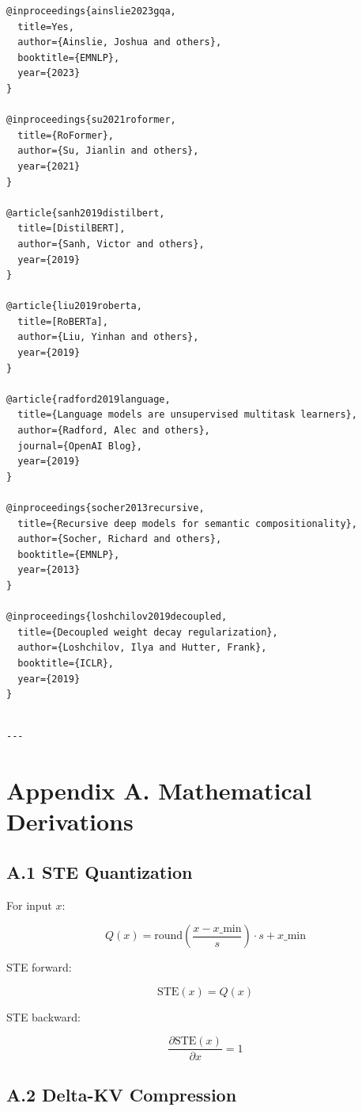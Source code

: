 \begin{lstlisting}
@inproceedings{ainslie2023gqa,
  title=Yes,
  author={Ainslie, Joshua and others},
  booktitle={EMNLP},
  year={2023}
}

@inproceedings{su2021roformer,
  title={RoFormer},
  author={Su, Jianlin and others},
  year={2021}
}

@article{sanh2019distilbert,
  title=[DistilBERT],
  author={Sanh, Victor and others},
  year={2019}
}

@article{liu2019roberta,
  title=[RoBERTa],
  author={Liu, Yinhan and others},
  year={2019}
}

@article{radford2019language,
  title={Language models are unsupervised multitask learners},
  author={Radford, Alec and others},
  journal={OpenAI Blog},
  year={2019}
}

@inproceedings{socher2013recursive,
  title={Recursive deep models for semantic compositionality},
  author={Socher, Richard and others},
  booktitle={EMNLP},
  year={2013}
}

@inproceedings{loshchilov2019decoupled,
  title={Decoupled weight decay regularization},
  author={Loshchilov, Ilya and Hutter, Frank},
  booktitle={ICLR},
  year={2019}
}
\end{lstlisting}
\begin{lstlisting}

---
\end{lstlisting}

\section{Appendix A. Mathematical Derivations}

\subsection{A.1 STE Quantization}

For input $x$:

\[
Q(x) = \text{round}\!\left(\frac{x - x\_\text{min}}{s}\right) \cdot s + x\_\text{min}
\tag{A.1}
\]

STE forward:

\[
\text{STE}(x) = Q(x)
\tag{A.2}
\]

STE backward:

\[
\frac{\partial \text{STE}(x)}{\partial x} = 1
\tag{A.3}
\]

\subsection{A.2 Delta-KV Compression}


